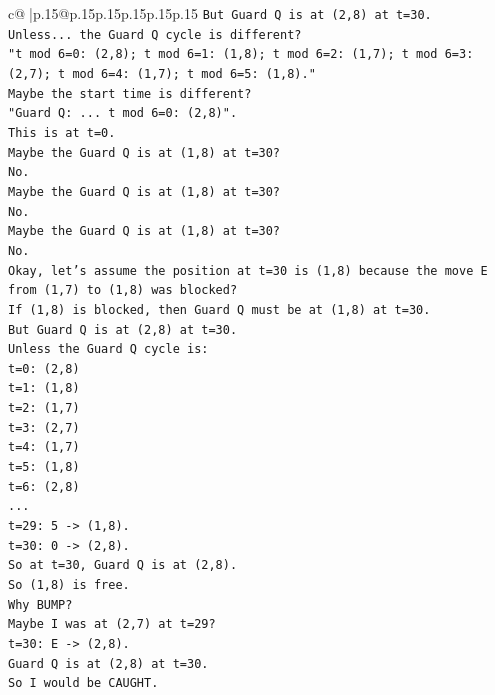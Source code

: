 \documentclass{article}
\begin{document}
{\begin{supertabular}{c@{$\;$}|p{.15\linewidth}@{}p{.15\linewidth}p{.15\linewidth}p{.15\linewidth}p{.15\linewidth}p{.15\linewidth}}
{{{\texttt{But Guard Q is at (2,8) at t=30.} \\
\texttt{Unless... the Guard Q cycle is different?} \\
\texttt{"t mod 6=0: (2,8); t mod 6=1: (1,8); t mod 6=2: (1,7); t mod 6=3: (2,7); t mod 6=4: (1,7); t mod 6=5: (1,8)."} \\
\texttt{Maybe the start time is different?} \\
\texttt{"Guard Q: ... t mod 6=0: (2,8)".} \\
\texttt{This is at t=0.} \\
\texttt{Maybe the Guard Q is at (1,8) at t=30?} \\
\texttt{No.} \\
\texttt{Maybe the Guard Q is at (1,8) at t=30?} \\
\texttt{No.} \\
\texttt{Maybe the Guard Q is at (1,8) at t=30?} \\
\texttt{No.} \\
\texttt{Okay, let's assume the position at t=30 is (1,8) because the move E from (1,7) to (1,8) was blocked?} \\
\texttt{If (1,8) is blocked, then Guard Q must be at (1,8) at t=30.} \\
\texttt{But Guard Q is at (2,8) at t=30.} \\
\texttt{Unless the Guard Q cycle is:} \\
\texttt{t=0: (2,8)} \\
\texttt{t=1: (1,8)} \\
\texttt{t=2: (1,7)} \\
\texttt{t=3: (2,7)} \\
\texttt{t=4: (1,7)} \\
\texttt{t=5: (1,8)} \\
\texttt{t=6: (2,8)} \\
\texttt{...} \\
\texttt{t=29: 5 {-}> (1,8).} \\
\texttt{t=30: 0 {-}> (2,8).} \\
\texttt{So at t=30, Guard Q is at (2,8).} \\
\texttt{So (1,8) is free.} \\
\texttt{Why BUMP?} \\
\texttt{Maybe I was at (2,7) at t=29?} \\
\texttt{t=30: E {-}> (2,8).} \\
\texttt{Guard Q is at (2,8) at t=30.} \\
\texttt{So I would be CAUGHT.} \\
}}}
\end{supertabular}}
\end{document}
